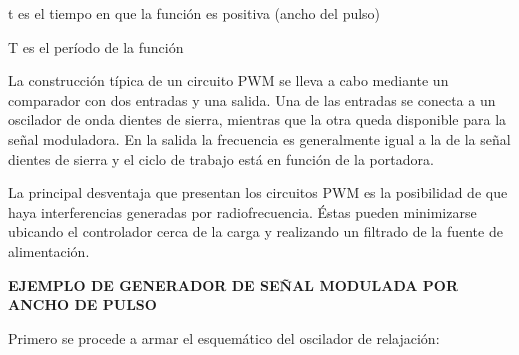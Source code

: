 \documentclass[12pt]{article}
\begin{document}
\begin{Center}
t es el tiempo en que la función es positiva (ancho del pulso)
\end{Center}\par

\begin{Center}
T es el período de la función
\end{Center}\par

\setlength{\parskip}{24.0pt}
{\fontsize{11pt}{13.2pt}\selectfont \textcolor[HTML]{474747}{La construcción típica de un circuito PWM se lleva a cabo mediante un comparador con dos entradas y una salida. Una de las entradas se conecta a un oscilador de onda dientes de sierra, mientras que la otra queda disponible para la señal moduladora. En la salida la frecuencia es generalmente igual a la de la señal dientes de sierra y el ciclo de trabajo está en función de la portadora.}\par}\par

{\fontsize{11pt}{13.2pt}\selectfont \textcolor[HTML]{474747}{La principal desventaja que presentan los circuitos PWM es la posibilidad de que haya interferencias generadas por radiofrecuencia. Éstas pueden minimizarse ubicando el controlador cerca de la carga y realizando un filtrado de la fuente de alimentación.}\par}\par


\vspace{\baselineskip}

\vspace{\baselineskip}

\vspace{\baselineskip}
\begin{Center}
\textbf{EJEMPLO DE GENERADOR DE SEÑAL MODULADA POR ANCHO DE PULSO}
\end{Center}\par

\begin{Center}
\textcolor[HTML]{656565}{Primero se procede a armar el esquemático del oscilador de relajación:}
\end{Center}\par



\end{document}
